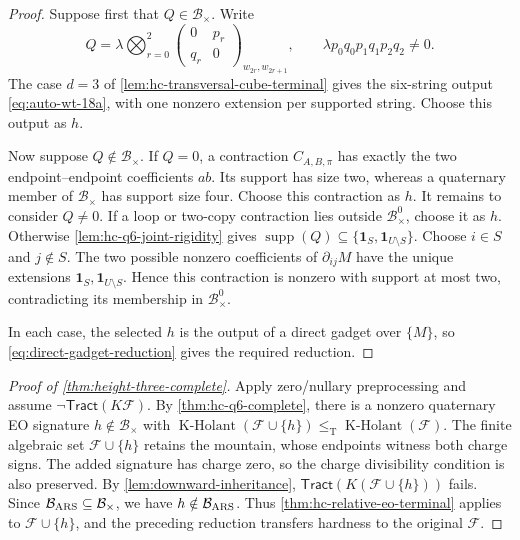 \documentclass[11pt,letterpaper,onecolumn]{article}
\theoremstyle{plain}
\theoremstyle{definition}
\theoremstyle{remark}
\newcommand{\cF}{\mathcal F}
\newcommand{\KHolant}{\operatorname{K\text{-}Holant}}
\newcommand{\Tract}{\mathsf{Tract}}
\newcommand{\one}{\mathbf 1}
\newcommand{\leT}{\leq_{\mathrm T}}
\begin{document}
	\begin{proof}
		Suppose first that \(Q\in\mathcal B_\times\). Write
		\[
		Q=\lambda\bigotimes_{r=0}^2
		\begin{pmatrix}0&p_r\\q_r&0\end{pmatrix}_{w_{2r},w_{2r+1}},
		\qquad \lambda p_0q_0p_1q_1p_2q_2\ne0.
		\]
		The case \(d=3\) of \cref{lem:hc-transversal-cube-terminal} gives the
		six-string output \eqref{eq:auto-wt-18a}, with one nonzero extension per
		supported string. Choose this output as \(h\).
		
		Now suppose \(Q\notin\mathcal B_\times\). If \(Q=0\), a contraction
		\(C_{A,B,\pi}\) has exactly the two endpoint--endpoint coefficients
		\(ab\). Its support has size two, whereas a quaternary member of
		\(\mathcal B_\times\) has support size four. Choose this contraction as \(h\).
		It remains to consider \(Q\ne0\). If a loop or two-copy contraction
		lies outside \(\mathcal B_\times^0\), choose it as \(h\).
		Otherwise \cref{lem:hc-q6-joint-rigidity} gives
		\(\operatorname{supp}(Q)\subseteq\{\one_S,\one_{U\setminus S}\}\).
		Choose \(i\in S\) and \(j\notin S\). The two possible nonzero
        coefficients of \(\partial_{ij}M\) have the unique extensions
        \(\one_S,\one_{U\setminus S}\). Hence this contraction is nonzero with support at
		most two, contradicting its membership in \(\mathcal B_\times^0\).
		
		In each case, the selected \(h\) is the output of a direct gadget over
		\(\{M\}\), so \cref{eq:direct-gadget-reduction} gives the required reduction.
	\end{proof}
	
	
	\begin{proof}[Proof of \cref{thm:height-three-complete}]
		Apply zero/nullary preprocessing and assume \(\neg\Tract(K\cF)\).
		By \cref{thm:hc-q6-complete}, there is a nonzero quaternary EO signature
		\(h\notin\mathcal B_\times\) with
		\(\KHolant(\cF\cup\{h\})\leT\KHolant(\cF)\).
		The finite algebraic set \(\cF\cup\{h\}\) retains the mountain, whose
		endpoints witness both charge signs. The added signature has charge zero,
		so the charge divisibility condition is also preserved.
		By \cref{lem:downward-inheritance}, \(\Tract(K(\cF\cup\{h\}))\) fails.
		Since \(\mathcal B_{\rm ARS}\subseteq\mathcal B_\times\), we have
		\(h\notin\mathcal B_{\rm ARS}\). Thus
		\cref{thm:hc-relative-eo-terminal} applies to \(\cF\cup\{h\}\), and the
		preceding reduction transfers hardness to the original \(\cF\).
	\end{proof}
	
\end{document}
